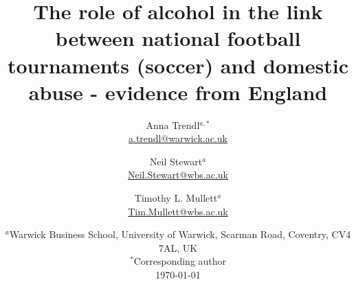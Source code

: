 \documentclass[12pt, a4paper]{article}
\title{}
\author{}
\date{}
\begin{document}
\title{The role of alcohol in the link between national football tournaments (soccer) and domestic abuse - evidence from England}

\author{Anna Trendl$^{a,*}$ \\ \href{mailto:a.trendl@warwick.ac.uk}{a.trendl@warwick.ac.uk}\\
 \and Neil Stewart$^a$ \\ 
 \href{mailto:neil.stewart@wbs.ac.uk}{Neil.Stewart@wbs.ac.uk}
 \\ 
 \and Timothy L. Mullett$^a$ \\
 \href{mailto:Tim.Mullett@wbs.ac.uk}{Tim.Mullett@wbs.ac.uk}
 \\}
 
\date{
    $^a$Warwick Business School, University of Warwick, Scarman Road, Coventry, CV4 7AL, UK\\
    $^*$Corresponding author\\[2ex]%
    \today
}
\end{document}
